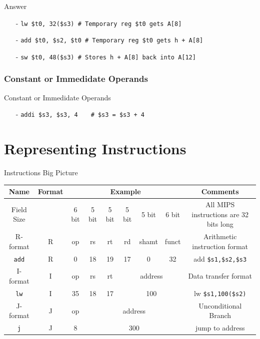 \begin{frame}{Answer}
\begin{itemize}
\item[-]
\texttt{lw \$t0, 32(\$s3) \# Temporary reg \$t0 gets A[8]}

\item[-]
\texttt{add \$t0, \$s2, \$t0  \# Temporary reg \$t0 gets h + A[8]}

\item[-]
\texttt{sw \$t0, 48(\$s3)  \# Stores h + A[8] back into A[12]}
\end{itemize}    
\end{frame}

\subsubsection{Constant or Immedidate Operands}
\begin{frame}{Constant or Immedidate Operands}
\begin{itemize}
\item[-] \texttt{addi \$s3, \$s3, 4  $\, \, \, \, \,$ \# \$s3 = \$s3 + 4}
\end{itemize}
\end{frame}

\section{Representing Instructions}
\begin{frame}{Instructions Big Picture}
\begin{table}[H]
\begin{adjustbox}{width=\textwidth}
\begin{tabular}{|c|c|c|c|c|c|c|c|c|}
\hline
Name & Format & \multicolumn{6}{|c|}{Example} & Comments \\
\hline
\hline
Field Size && 6 bit & 5 bit & 5 bit & 5 bit & 5 bit & 6 bit & All MIPS instructions are 32 bits long \\
\hline
R-format & R & op & rs & rt & rd & shamt & funct & Arithmetic instruction format \\
\hline
\texttt{add} & R & 0 & 18 & 19 & 17 & 0 & 32 & add \texttt{\$s1,\$s2,\$s3} \\
\hline
I-format & I & op & rs & rt & \multicolumn{3}{|c|}{address} & Data transfer format\\
\hline
\texttt{lw} & I & 35 & 18 & 17 & \multicolumn{3}{|c|}{100} & lw \texttt{\$s1,100(\$s2)} \\
\hline
J-format & J & op & \multicolumn{5}{|c|}{address} & Unconditional Branch \\
\hline
\texttt{j} & J & 8 & \multicolumn{5}{|c|}{300} & jump to address \\
\hline

\end{tabular}
\end{adjustbox}
\end{table}
\end{frame}

